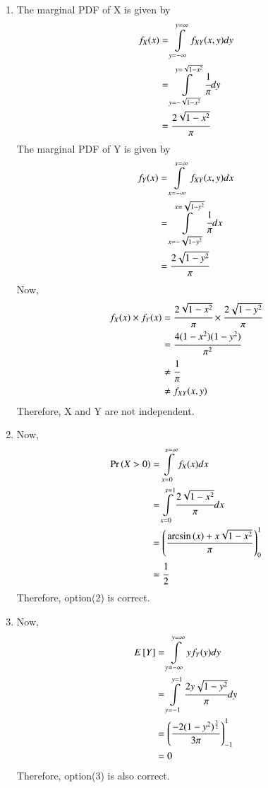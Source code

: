 \begin{enumerate}
    \item 
The marginal PDF of X is given by
\begin{align}
    f_X(x)&=\displaystyle\int\limits_{y=-\infty}^{y=\infty} f_{XY}(x,y) dy\\
          &=\displaystyle\int\limits_{y=-\sqrt{1-x^2}}^{y=\sqrt{1-x^2}}\cfrac{1}{\pi} dy\\
          &=\cfrac{2\sqrt{1-x^2}}{\pi}
\end{align}
The marginal PDF of Y is given by
\begin{align}
    f_Y(x)&=\displaystyle\int\limits_{x=-\infty}^{x=\infty} f_{XY}(x,y) dx\\
          &=\displaystyle\int\limits_{x=-\sqrt{1-y^2}}^{x=\sqrt{1-y^2}}\cfrac{1}{\pi} dx\\
          &=\cfrac{2\sqrt{1-y^2}}{\pi}
\end{align}
Now,
\begin{align}
    f_X(x)\times f_Y(x) &=\cfrac{2\sqrt{1-x^2}}{\pi} \times\cfrac{2\sqrt{1-y^2}}{\pi}\\
    &= \cfrac{4(1-x^2)(1-y^2)}{\pi^2}\\
    &\neq \cfrac{1}{\pi}\\
    &\neq f_{XY}(x,y)
\end{align}
Therefore, X and Y are not independent.\\
\item
Now,
\begin{align}
    \Pr\left(X>0\right)&=\displaystyle\int\limits_{x=0}^{x=\infty}f_X(x)dx\\
    &=\displaystyle\int\limits_{x=0}^{x=1}\cfrac{2\sqrt{1-x^2}}{\pi} dx\\
    &=\left(\frac{\arcsin{(x)}+x\sqrt{1-x^2}}{\pi}\right)_{0}^{1}\\
    &=\cfrac{1}{2}
\end{align}
Therefore, option(2) is correct.\\
\item
Now,
\begin{align}
    E{}\left[Y\right]&=\displaystyle\int\limits_{y=-\infty}^{y=\infty}yf_Y(y)dy\\
    &=\displaystyle\int\limits_{y=-1}^{y=1}\cfrac{2y\sqrt{1-y^2}}{\pi}dy\\
    &=\left(\frac{-2(1-y^2)^{\frac{3}{2}}}{3\pi}\right)_{-1}^{1}\\
    &=0
\end{align}
Therefore, option(3) is also correct.\\

\end{enumerate}
